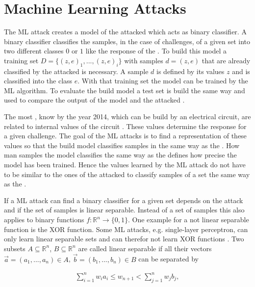 \chapter{Machine Learning Attacks}
\label{cap:mla}

The \ac{ML} attack creates a \puf model of the attacked \puf which acts as binary classifier.
A binary classifier classifies the samples, in the case of \pufs challenges, of a given set into two different classes $0$ or $1$ like the response of the \puf.
To build this model a training set $D = \{(z, e)_1, ..., (z,e)_i\}$ with samples $d = (z, e)$ that are already classified by the attacked \puf is necessary.
A sample $d$ is defined by its values $z$ and is classified into the class $e$.
With that training set the model can be trained by the \ac{ML} algorithm.
To evaluate the build model a test set is build the same way and used to compare the output of the \puf model and the attacked \puf.

The most \pufs, know by the year 2014, which can be build by an electrical circuit, are related to internal values of the circuit \cite{Ruhrmair2014PUFOverview}.
These values determine the response for a given challenge. 
The goal of the \ac{ML} attacks is to find a representation of these values so that the build model classifies samples in the same way as the \puf. %
How man samples the model classifies the same way as the \puf defines how precise the model has been trained.
Hence the values learned by the \ac{ML} attack do not have to be similar to the ones of the attacked \puf to classify samples of a set the same way as the \puf.

If a \ac{ML} attack can find a binary classifier for a given set depends on the attack and if the set of samples is linear separable. 
Instead of a set of samples this also applies to binary functions $f: \mathbb{R}^n \to \{0,1\}$. %
One example for a not linear separable function is the \ac{XOR} function. %
Some \ac{ML} attacks, e.g. single-layer perceptron, can only learn linear separable sets and can therefor not learn \ac{XOR} functions \cite{Minsky1969Perceptrons:Geometry}.
Two subsets $A \subseteq \mathbb{R}^n$, $B \subseteq \mathbb{R}^n$ are called linear separable if all their vectors $\vec{a} = (a_1, ..., a_n) \in A$, $\vec{b} = (b_1, ..., b_n) \in B$ can be separated by

\begin{align}
\sum_{i=1}^{n} w_i a_i \le w_{n + 1} < \sum_{j=1}^{n} w_j b_j, \label{equ:linearseparable}
\end{align}

